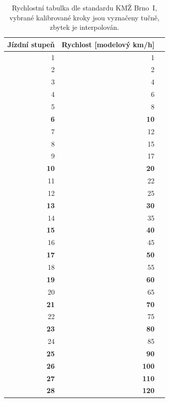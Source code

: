 \begin{table}[ht]
	\begin{tabularx}{0.66\textwidth}{rrX}
		\toprule
		Jízdní stupeň & Rychlost [modelový km/h] \\
		\midrule
		1 & 1 \\
		2 & 2 \\
		3 & 4 \\
		4 & 6 \\
		5 & 8 \\
		\textbf{6} & \textbf{10} \\
		7 & 12 \\
		8 & 15 \\
		9 & 17 \\
		\textbf{10} & \textbf{20} \\
		11 & 22 \\
		12 & 25 \\
		\textbf{13} & \textbf{30} \\
		14 & 35 \\
		\textbf{15} & \textbf{40} \\
		16 & 45 \\
		\textbf{17} & \textbf{50} \\
		18 & 55 \\
		\textbf{19} & \textbf{60} \\
		20 & 65 \\
		\textbf{21} & \textbf{70} \\
		22 & 75 \\
		\textbf{23} & \textbf{80} \\
		24 & 85 \\
		\textbf{25} & \textbf{90} \\
		\textbf{26} & \textbf{100} \\
		\textbf{27} & \textbf{110} \\
		\textbf{28} & \textbf{120} \\
		\bottomrule
	\end{tabularx}
	\caption{Rychlostní tabulka dle standardu KMŽ Brno~I, vybrané kalibrované
	kroky jsou vyznačeny tučně, zbytek je interpolován.}
	\label{fig:step-to-speed}
\end{table}
